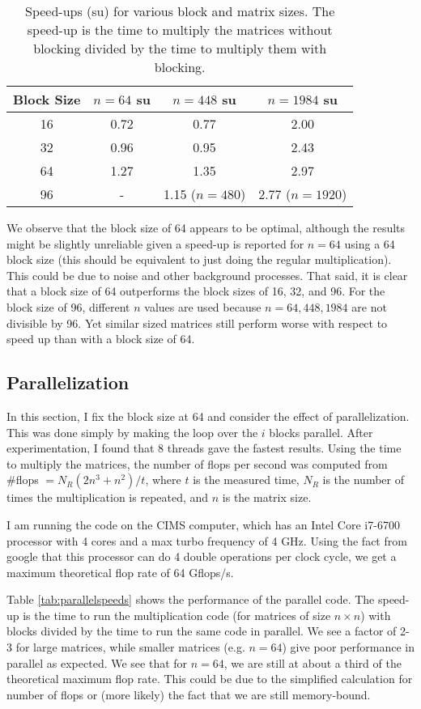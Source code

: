 \documentclass[a4paper]{article}
\begin{document}
\begin{table}[ht]
\centering
\begin{tabular}{c|c|c|c} 
Block Size & $n=64$ su & $n=448$ su & $n=1984$ su \\[2 pt] \hline
16 & 0.72 & 0.77 & 2.00 \\[2 pt]
32 & 0.96 & 0.95 & 2.43 \\[2 pt]
64 & 1.27 & 1.35 & 2.97 \\[2 pt]
96 & -& 1.15 ($n=480$) & 2.77 ($n=1920$)\\[2 pt]
\end{tabular}
\caption{Speed-ups (su) for various block and matrix sizes. The speed-up is the time to multiply the matrices without blocking divided by the time to multiply them with blocking.}
\label{tab:blockspeeds}
\end{table}
We observe that the block size of 64 appears to be optimal, although the results might be slightly unreliable given a speed-up is reported for $n=64$ using a 64 block size (this should be equivalent to just doing the regular multiplication). This could be due to noise and other background processes. That said, it is clear that a block size of 64 outperforms the block sizes of 16, 32, and 96. For the block size of 96, different $n$ values are used because $n=64, 448, 1984$ are not divisible by 96. Yet similar sized matrices still perform worse with respect to speed up than with a block size of 64. 

\subsection*{Parallelization}
In this section, I fix the block size at 64 and consider the effect of parallelization. This was done simply by making the loop over the $i$ blocks parallel. After experimentation, I found that 8 threads gave the fastest results. Using the time to multiply the matrices, the number of flops per second was computed from \newline \#flops $=N_R(2n^3+n^2)/t$, where $t$ is the measured time, $N_R$ is the number of times the multiplication is repeated, and $n$ is the matrix size. 

I am running the code on the CIMS computer, which has an Intel Core i7-6700 processor with 4 cores and a max turbo frequency of 4 GHz. Using the fact from google that this processor can do 4 double operations per clock cycle, we get a maximum theoretical flop rate of 64 Gflops/s. 

Table \ref{tab:parallelspeeds} shows the performance of the parallel code. The speed-up is the time to run the multiplication code (for matrices of size $n \times n$) with blocks divided by the time to run the same code in parallel. We see a factor of 2-3 for large matrices, while smaller matrices (e.g. $n=64$) give poor performance in parallel as expected. We see that for $n=64$, we are still at about a third of the theoretical maximum flop rate. This could be due to the simplified calculation for number of flops or (more likely) the fact that we are still memory-bound. 
\end{document}
